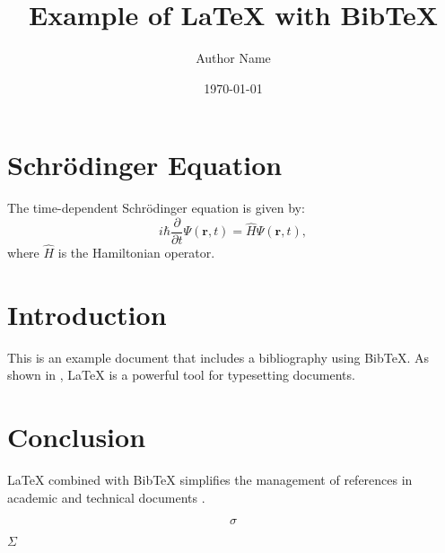 \documentclass{article}
\title{Example of LaTeX with BibTeX}
\author{Author Name}
\date{\today}
\begin{document}
\maketitle

\section{Schr\"odinger Equation}
The time-dependent Schr\"odinger equation is given by:
\begin{equation}
  i\hbar \frac{\partial}{\partial t} \Psi(\mathbf{r}, t) = \hat{H}
  \Psi(\mathbf{r}, t),
\end{equation}
where $\hat{H}$ is the Hamiltonian operator.

\section{Introduction}
This is an example document that includes a bibliography using
BibTeX. As shown in \cite{lamport1994latex}, LaTeX is a powerful tool
for typesetting documents.

\section{Conclusion}
LaTeX combined with BibTeX simplifies the management of references in
academic and technical documents \cite{knuth1984tex}.

$$\sigma$$

\begin{math}
  \Sigma
\end{math}



\end{document}
